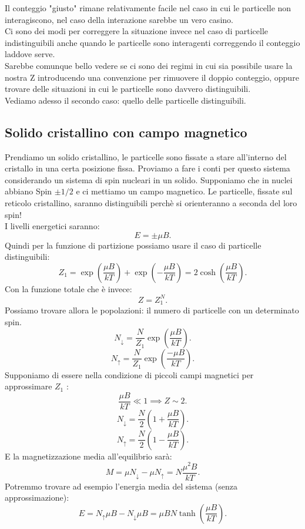 Il conteggio "giusto" rimane relativamente facile nel caso in cui le particelle non interagiscono, nel caso della interazione sarebbe un vero casino.\\
Ci sono dei modi per correggere la situazione invece nel caso di particelle indistinguibili anche quando le particelle sono interagenti correggendo il conteggio laddove serve.\\
Sarebbe comunque bello vedere se ci sono dei regimi in cui sia possibile usare la nostra Z introducendo una convenzione per rimuovere il doppio conteggio, oppure trovare delle situazioni in cui le particelle sono davvero distinguibili.\\
Vediamo adesso il secondo caso: quello delle particelle distinguibili.\\
\subsection{Solido cristallino con campo magnetico}%
Prendiamo un solido cristallino, le particelle sono fissate a stare all'interno del cristallo in una certa posizione fissa. Proviamo a fare i conti per questo sistema considerando un sistema di spin nucleari in un solido. Supponiamo che in nuclei abbiano Spin $\pm 1 /2$ e ci mettiamo un campo magnetico. Le particelle, fissate sul reticolo cristallino, saranno distinguibili perchè si orienteranno a seconda del loro spin!\\
I livelli energetici saranno:
\[
	E = \pm \mu B
.\] 
Quindi per la funzione di partizione possiamo usare il caso di particelle distinguibili:
\[
	Z_1 = \exp\left( \frac{\mu B}{kT} \right) + \exp \left( - \frac{\mu B}{kT} \right) = 2 \cosh\left( \frac{\mu B}{kT} \right) 
.\] 
Con la funzione totale che è invece:
\[
	Z = Z_1^{N}
.\] 
Possiamo trovare allora le popolazioni: il numero di particelle con un determinato spin.
\[
	N_{\downarrow} = \frac{N}{Z_1}\exp{\left( \frac{\mu B}{kT} \right) }
.\] 
\[
	N_{\uparrow} = \frac{N}{Z_1}\exp{\left( \frac{-\mu B}{kT} \right) }
.\] 
Supponiamo di essere nella condizione di piccoli campi magnetici per approssimare $Z_1$ :
\[
	\frac{\mu B}{kT}\ll 1 \implies Z\sim 2
.\] 
\[
	N_{\downarrow}=\frac{N}{2} \left( 1 + \frac{\mu B}{kT} \right) 
.\] 
\[
	N_{\uparrow}=\frac{N}{2} \left( 1 - \frac{\mu B}{kT} \right) 
.\] 
E la magnetizzazione media all'equilibrio sarà:
\[
	M = \mu N_{\downarrow} -\mu N_{\uparrow}= N \frac{\mu^2 B}{kT}
.\] 
Potremmo trovare ad esempio l'energia media del sistema (senza approssimazione):
\[
	E = N_{\uparrow}\mu B- N_{\downarrow} \mu B = \mu B N \tanh \left( \frac{\mu B}{kT} \right) 
.\]  
